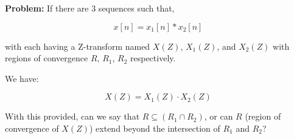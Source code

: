 \documentclass{article}
\begin{document}
\textbf{Problem:}
If there are 3 sequences such that,

\[
x[n] = x_1[n] \ast x_2[n]
\]

with each having a Z-transform named \( X(Z) \), \( X_1(Z) \), and \( X_2(Z) \) with regions of convergence \( R \), \( R_1 \), \( R_2 \) respectively.

We have:

\[
X(Z) = X_1(Z) \cdot X_2(Z)
\]

With this provided, can we say that \( R \subseteq (R_1 \cap R_2) \), or can \( R \) (region of convergence of \( X(Z) \)) extend beyond the intersection of \( R_1 \) and \( R_2 \)?
\end{document}

